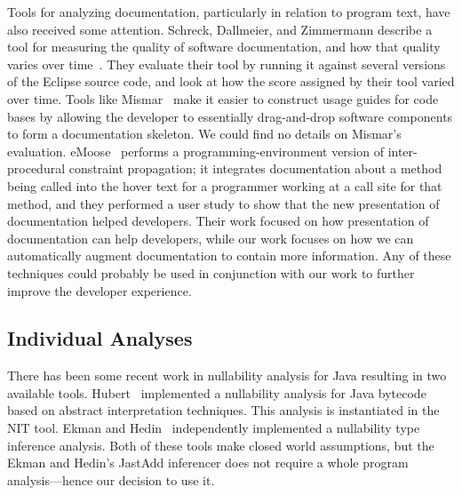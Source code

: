 Tools for analyzing documentation, particularly in relation to program text,
have also received some attention.  Schreck, Dallmeier, and Zimmermann describe
a tool for measuring the quality of software documentation, and how that
quality varies over time~\cite{evolvedoc}. They evaluate their tool by running
it against several versions of the Eclipse source code, and look at how the
score assigned by their tool varied over time.  Tools like Mismar~\cite{mismar} make
it easier to construct usage guides for code bases by allowing the developer to
essentially drag-and-drop software components to form a documentation skeleton.
We could find no details on Mismar's evaluation.
eMoose~\cite{emoose} performs a programming-environment version of
inter-procedural constraint propagation; it integrates
documentation about a method being called into the hover text for a programmer
working at a call site for that method, and they performed a user study to show
that the new presentation of documentation helped developers.  Their work
focused on how presentation of documentation can help developers, while our work
focuses on how we can automatically augment documentation to contain more
information.  Any of these
techniques could probably be used
in conjunction with our work to further improve the developer experience.

\subsection{Individual Analyses}

There has been some recent work in nullability analysis for Java
resulting in two available tools.  Hubert~\cite{NIT} implemented a nullability
analysis for Java bytecode based on abstract interpretation techniques.  This
analysis is instantiated in the {\sc NIT} tool.  Ekman and
Hedin~\cite{NonNullTypeInference} independently implemented a nullability type
inference analysis.  Both of these tools make closed world assumptions, but the
Ekman and Hedin's JastAdd inferencer does not require a whole program
analysis---hence our decision to use it.


